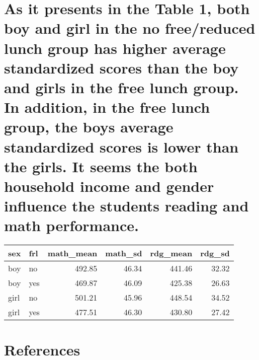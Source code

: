 \documentclass[
  letterpaper,
  DIV=11,
  numbers=noendperiod]{scrartcl}
\begin{document}
\section{As it presents in the Table 1, both boy and girl in the no
free/reduced lunch group has higher average standardized scores than the
boy and girls in the free lunch group. In addition, in the free lunch
group, the boys average standardized scores is lower than the girls. It
seems the both household income and gender influence the students
reading and math
performance.}\label{as-it-presents-in-the-table-1-both-boy-and-girl-in-the-no-freereduced-lunch-group-has-higher-average-standardized-scores-than-the-boy-and-girls-in-the-free-lunch-group.-in-addition-in-the-free-lunch-group-the-boys-average-standardized-scores-is-lower-than-the-girls.-it-seems-the-both-household-income-and-gender-influence-the-students-reading-and-math-performance.}

\begin{longtable}[]{@{}llrrrr@{}}
\toprule\noalign{}
sex & frl & math\_mean & math\_sd & rdg\_mean & rdg\_sd \\
\midrule\noalign{}
\endhead
\bottomrule\noalign{}
\endlastfoot
boy & no & 492.85 & 46.34 & 441.46 & 32.32 \\
boy & yes & 469.87 & 46.09 & 425.38 & 26.63 \\
girl & no & 501.21 & 45.96 & 448.54 & 34.52 \\
girl & yes & 477.51 & 46.30 & 430.80 & 27.42 \\
\end{longtable}

\newpage

\section*{References}\label{references}
\end{document}
